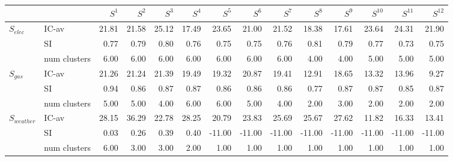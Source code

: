 \begin{tabular}{llrrrrrrrrrrrr}
\toprule
 &  & $S^{1}$ & $S^{2}$ & $S^{3}$ & $S^{4}$ & $S^{5}$ & $S^{6}$ & $S^{7}$ & $S^{8}$ & $S^{9}$ & $S^{10}$ & $S^{11}$ & $S^{12}$ \\
\midrule
\multirow[c]{3}{*}{$S_{elec}$} & IC-av & 21.81 & 21.58 & 25.12 & 17.49 & 23.65 & 21.00 & 21.52 & 18.38 & 17.61 & 23.64 & 24.31 & 21.90 \\
 & SI & 0.77 & 0.79 & 0.80 & 0.76 & 0.75 & 0.75 & 0.76 & 0.81 & 0.79 & 0.77 & 0.73 & 0.75 \\
 & num clusters & 6.00 & 6.00 & 6.00 & 6.00 & 6.00 & 6.00 & 6.00 & 4.00 & 4.00 & 5.00 & 5.00 & 5.00 \\
\multirow[c]{3}{*}{$S_{gas}$} & IC-av & 21.26 & 21.24 & 21.39 & 19.49 & 19.32 & 20.87 & 19.41 & 12.91 & 18.65 & 13.32 & 13.96 & 9.27 \\
 & SI & 0.94 & 0.86 & 0.87 & 0.87 & 0.86 & 0.86 & 0.86 & 0.77 & 0.87 & 0.87 & 0.85 & 0.87 \\
 & num clusters & 5.00 & 5.00 & 4.00 & 6.00 & 6.00 & 5.00 & 4.00 & 2.00 & 3.00 & 2.00 & 2.00 & 2.00 \\
\multirow[c]{3}{*}{$S_{weather}$} & IC-av & 28.15 & 36.29 & 22.78 & 28.25 & 20.79 & 23.83 & 25.69 & 25.67 & 27.62 & 11.82 & 16.33 & 13.41 \\
 & SI & 0.03 & 0.26 & 0.39 & 0.40 & -11.00 & -11.00 & -11.00 & -11.00 & -11.00 & -11.00 & -11.00 & -11.00 \\
 & num clusters & 6.00 & 3.00 & 3.00 & 2.00 & 1.00 & 1.00 & 1.00 & 1.00 & 1.00 & 1.00 & 1.00 & 1.00 \\
\bottomrule
\end{tabular}
